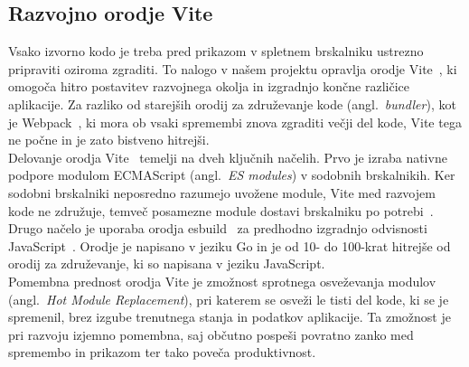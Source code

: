 \documentclass[a4paper,12pt,openright]{book}
\begin{document}
\subsection{Razvojno orodje Vite}
Vsako izvorno kodo je treba pred prikazom v spletnem brskalniku ustrezno pripraviti oziroma zgraditi. To nalogo
v našem projektu opravlja orodje Vite~\cite{vite-docs}, ki omogoča hitro postavitev razvojnega okolja in izgradnjo končne različice
aplikacije. Za razliko od starejših orodij za združevanje kode (angl.\ \textit{bundler}), kot
je Webpack~\cite{webpack-docs}, ki mora ob vsaki spremembi znova zgraditi večji del kode, Vite tega ne počne in je zato bistveno
hitrejši.\\
Delovanje orodja Vite~\cite{vite-docs} temelji na dveh ključnih načelih. Prvo je izraba nativne podpore modulom ECMAScript
(angl.\ \textit{ES modules}) v sodobnih brskalnikih. Ker sodobni brskalniki neposredno razumejo uvožene module,
 Vite med razvojem kode ne združuje, temveč posamezne module dostavi brskalniku po potrebi~\cite{vite-docs}. Drugo načelo je uporaba orodja esbuild~\cite{esbuild-docs} za predhodno izgradnjo odvisnosti JavaScript~\cite{flanagan2020javascript}.
Orodje je napisano v jeziku Go in je od 10- do 100-krat hitrejše od orodij za združevanje, ki so napisana
v jeziku JavaScript.\\
Pomembna prednost orodja Vite je zmožnost sprotnega osveževanja modulov (angl.\ \textit{Hot Module Replacement}),
pri katerem se osveži le tisti del kode, ki se je spremenil, brez izgube trenutnega stanja in podatkov aplikacije.
Ta zmožnost je pri razvoju izjemno pomembna, saj občutno pospeši povratno zanko med spremembo in prikazom ter
tako poveča produktivnost.
\end{document}
